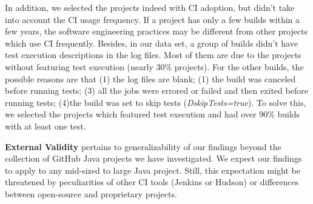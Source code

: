 In addition, we selected the projects indeed with CI adoption, but didn't take into account the CI usage frequency. If a project has only a few builds within a few years, the software engineering practices may be different from other projects which use CI frequently. 
Besides, in our data set, a group of builds didn't have test execution descriptions in the log files. Most of them are due to the projects without featuring test execution (nearly 30\% projects). For the other builds, the possible reasons are that (1) the log files are blank; (1) the build was canceled before running tests; (3) all the jobs were errored or failed and then exited before running tests; (4)the build was set to skip tests (\eg \textit{DskipTests=true}). To solve this, we selected the projects which featured test execution and had over 90\% builds with at least one test.


\textbf{External Validity} pertains to generalizability of our findings beyond the collection of GitHub Java projects we have investigated.
We expect our findings to apply to any mid-sized to large Java project.
Still, this expectation might be threatened by peculiarities of other CI tools (\eg Jenkins or Hudson) or differences between open-source and proprietary projects.

